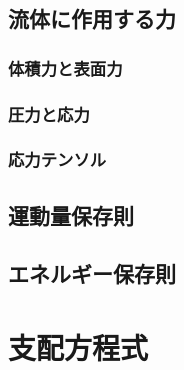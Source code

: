 \documentclass[uplatex,dvipdfmx,a4j,11pt]{jsreport}
\newcommand{\keyword}[1]{\textcolor{mainblue}{\textbf{#1}}}
\newcommand{\diff}{\mathrm{d}} %
\numberwithin{equation}{chapter}
\begin{document}

\subsection{流体に作用する力}

\subsubsection{体積力と表面力}

\subsubsection{圧力と応力}

\subsubsection{応力テンソル}

\subsection{運動量保存則}

\subsection{エネルギー保存則}

\section{支配方程式}
\end{document}
